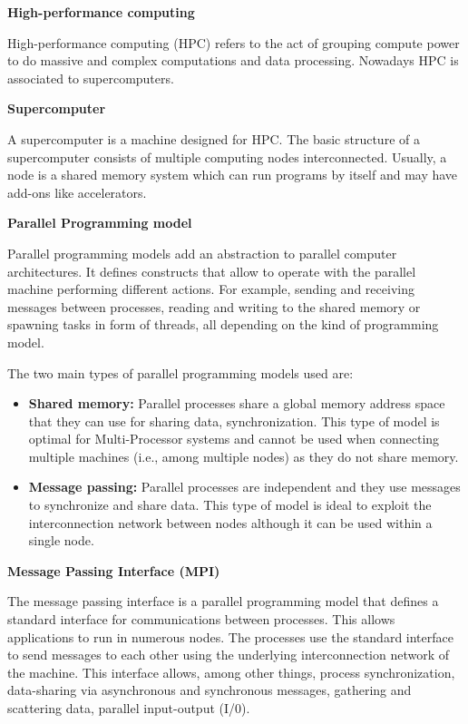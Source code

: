 \textbf{High-performance computing}

High-performance computing (HPC) refers to the act of grouping compute power to do massive and complex computations and data processing. Nowadays HPC is associated to supercomputers.

\textbf{Supercomputer}

A supercomputer is a machine designed for HPC. The basic structure of a supercomputer consists of multiple computing nodes interconnected. Usually, a node is a shared memory system which can run programs by itself and may have add-ons like accelerators.

\textbf{Parallel Programming model}

Parallel programming models \cite{programminModels} add an abstraction to parallel computer architectures.  It defines constructs that allow to operate with the parallel machine performing different actions. For example, sending and receiving messages between processes, reading and writing to the shared memory or spawning tasks in form of threads, all depending on the kind of programming model.

The two main types of parallel programming models used are:
\begin{itemize}
  \item \textbf{Shared memory:} Parallel processes share a global memory address space that they can use for sharing data, synchronization. This type of model is optimal for Multi-Processor systems and cannot be used when connecting multiple machines (i.e., among multiple nodes) as they do not share memory.
  \item \textbf{Message passing:} Parallel processes are independent and they use messages to synchronize and share data. This type of model is ideal to exploit the interconnection network between nodes although it can be used within a single node.
\end{itemize}

\textbf{Message Passing Interface (MPI)}

The message passing interface \cite{mpi} is a parallel programming model that defines a standard  interface for communications between processes. This allows applications to run in numerous nodes. The processes use the standard interface to send messages to each other using the underlying interconnection network of the machine. This interface allows, among other things, process synchronization, data-sharing via asynchronous and synchronous messages, gathering and scattering data, parallel input-output (I/0).

